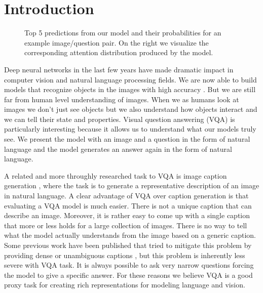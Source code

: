 \documentclass[10pt,twocolumn,letterpaper]{article}
\begin{document}
\section{Introduction}
\begin{figure}
\caption{Top 5 predictions from our model and their probabilities for an example image/question pair. On the right we visualize the corresponding attention distribution produced by the model.}
\label{fig:teaser}
\end{figure}
Deep neural networks in the last few years have made dramatic impact in computer vision and natural language processing fields. We are now able to build models that recognize objects in the images with high accuracy \cite{Krizhevsky2012ImageNetCW,Szegedy2015GoingDW,He2016DeepRL}. But we are still far from human level understanding of images. When we as humans look at images we don't just see objects but we also understand how objects interact and we can tell their state and properties. Visual question answering (VQA) \cite{Antol2015VQAVQ} is particularly interesting because it allows us to understand what our models truly see. We present the model with an image and a question in the form of natural language and the model generates an answer again in the form of natural language. 

A related and more throughly researched task to VQA is image caption generation \cite{Xu2015ShowAA,Vinyals2015ShowAT}, where the task is to generate a representative description of an image in natural language. A clear advantage of VQA over caption generation is that evaluating a VQA model is much easier. There is not a unique caption that can describe an image. Moreover, it is rather easy to come up with a single caption that more or less holds for a large collection of images. There is no way to tell what the model actually understands from the image based on a generic caption. Some previous work have been published that tried to mitigate this problem by providing dense \cite{Johnson2016DenseCapFC} or unambiguous captions \cite{Mao2016GenerationAC}, but this problem is inherently less severe with VQA task. It is always possible to ask very narrow questions forcing the model to give a specific answer. For these reasons we believe VQA is a good proxy task for creating rich representations for modeling language and vision.
\end{document}
